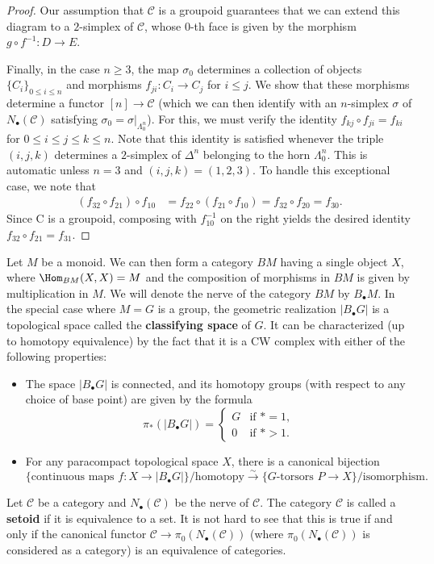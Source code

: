 \begin{proof}
Our assumption that $\mathcal{C}$ is a groupoid guarantees that we can extend this diagram to a $2$-simplex of $\mathcal{C}$, whose $0$-th face is given by the morphism $g\circ f^{-1}:D\to E$.\par
Finally, in the case $n\geq 3$, the map $\sigma_0$ determines a collection of objects $\{C_i\}_{0\leq i\leq n}$ and morphisms $f_{ji}:C_i\to C_j$ for $i\leq j$. We show that these morphisms determine a functor $[n]\to\mathcal{C}$ (which we can then identify with an $n$-simplex $\sigma$ of $N_\bullet(\mathcal{C})$ satisfying $\sigma_0=\sigma|_{\Lambda^n_0}$). For this, we must verify the identity $f_{kj}\circ f_{ji}=f_{ki}$ for $0\leq i\leq j\leq k\leq n$. Note that this identity is satisfied whenever the triple $(i,j,k)$ determines a $2$-simplex of $\Delta^n$ belonging to the horn $\Lambda^n_0$. This is automatic unless $n=3$ and $(i,j,k)=(1,2,3)$. To handle this exceptional case, we note that
\begin{align*}
(f_{32}\circ f_{21})\circ f_{10}&=f_{22}\circ (f_{21}\circ f_{10})=f_{32}\circ f_{20}=f_{30}.
\end{align*}
Since C is a groupoid, composing with $f_{10}^{-1}$ on the right yields the desired identity $f_{32}\circ f_{21}=f_{31}$.
\end{proof}
\begin{example}
Let $M$ be a monoid. We can then form a category $BM$ having a single object $X$, where $\Hom_{BM}(X,X)=M$ and the composition of morphisms in $BM$ is given by multiplication in $M$. We will denote the nerve of the category $BM$ by $B_\bullet M$. In the special case where $M=G$ is a group, the geometric realization $|B_\bullet G|$ is a topological space called the \textbf{classifying space} of $G$. It can be characterized (up to homotopy equivalence) by the fact that it is a CW complex with either of the following properties:
\begin{itemize}
\item The space $|B_\bullet G|$ is connected, and its homotopy groups (with respect to any choice of base point) are given by the formula
\[\pi_*(|B_\bullet G|)=\begin{cases}
G&\text{if $\ast=1$},\\
0&\text{if $\ast>1$}.
\end{cases}\]
\item For any paracompact topological space $X$, there is a canonical bijection
\[\{\text{continuous maps $f:X\to|B_\bullet G|$}\}/\text{homotopy}\stackrel{\sim}{\to}\{\text{$G$-torsors $P\to X$}\}/\text{isomorphism}.\]
\end{itemize}
\end{example}
\begin{example}
Let $\mathcal{C}$ be a category and $N_\bullet(\mathcal{C})$ be the nerve of $\mathcal{C}$. The category $\mathcal{C}$ is called a \textbf{setoid} if it is equivalence to a set. It is not hard to see that this is true if and only if the canonical functor $\mathcal{C}\to\pi_0(N_\bullet(\mathcal{C}))$ (where $\pi_0(N_\bullet(\mathcal{C}))$ is considered as a category) is an equivalence of categories.
\end{example}
